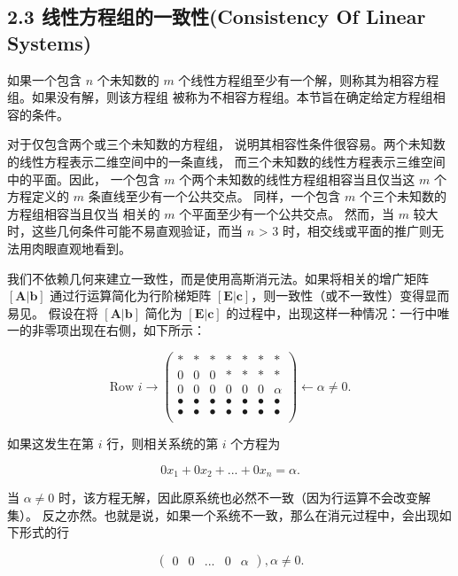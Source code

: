 \subsection{2.3 线性方程组的一致性(Consistency Of Linear Systems)}

如果一个包含 \(n\) 个未知数的 \(m\) 个线性方程组至少有一个解，则称其为相容方程组。如果没有解，则该方程组
被称为不相容方程组。本节旨在确定给定方程组相容的条件。

对于仅包含两个或三个未知数的方程组，
说明其相容性条件很容易。两个未知数的线性方程表示二维空间中的一条直线，
而三个未知数的线性方程表示三维空间中的平面。因此，
一个包含 \(m\) 个两个未知数的线性方程组相容当且仅当这 \(m\) 个方程定义的 \(m\) 条直线至少有一个公共交点。
同样，一个包含 \(m\) 个三个未知数的方程组相容当且仅当
相关的 \(m\) 个平面至少有一个公共交点。
然而，当 \(m\) 较大时，这些几何条件可能不易直观验证，而当 \(n\) > 3 时，相交线或平面的推广则无法用肉眼直观地看到。

我们不依赖几何来建立一致性，而是使用高斯消元法。如果将相关的增广矩阵 \([\mathbf{A}|\mathbf{b}]\) 通过行运算简化为行阶梯矩阵 \([\mathbf{E}|\mathbf{c}]\)，则一致性（或不一致性）变得显而易见。
假设在将 \([\mathbf{A}|\mathbf{b}]\) 简化为 \([\mathbf{E}|\mathbf{c}]\) 的过程中，出现这样一种情况：一行中唯一的非零项出现在右侧，如下所示：

\[
\text{Row }i \rightarrow 
\left(\begin{array}{cccccc|c}
* & * & * & * & * & * & * \\ 
0 & 0 & 0 & * & * & * & * \\ 
0 & 0 & 0 & 0 & 0 & 0 & \alpha \\
\bullet & \bullet & \bullet & \bullet & \bullet & \bullet & \bullet \\
\bullet & \bullet & \bullet & \bullet & \bullet & \bullet & \bullet \\
\end{array}\right)
\leftarrow \alpha \neq 0.
\]

如果这发生在第 \(i\) 行，则相关系统的第 \(i\) 个方程为

\[
0x_1 + 0x_2 + ... + 0x_n = \alpha.
\]

当 \(\alpha \neq 0\) 时，该方程无解，因此原系统也必然不一致（因为行运算不会改变解集）。
反之亦然。也就是说，如果一个系统不一致，那么在消元过程中，会出现如下形式的行

\[
\left(\begin{array}{cccccc|c}
0 & 0 & ... & 0 & \alpha
\end{array}\right), \alpha \neq 0.
\]


